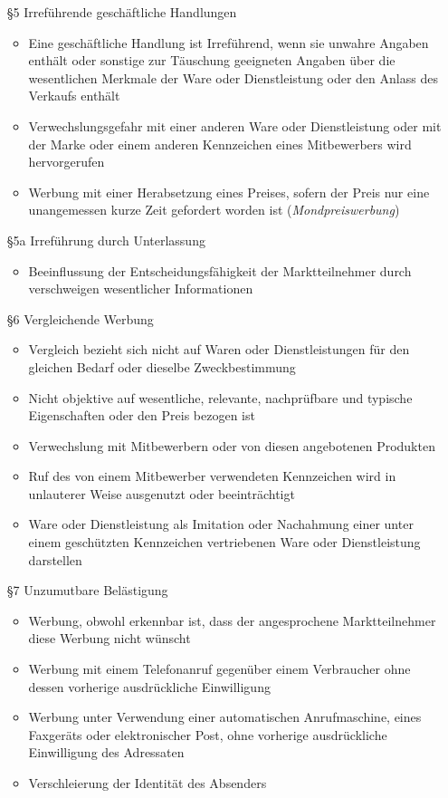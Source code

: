 \begin{itemize}
\begin{enumerate}
	\end{enumerate}
	\item[§5] Irreführende geschäftliche Handlungen
	\begin{itemize}
		\item Eine geschäftliche Handlung ist Irreführend, wenn sie unwahre Angaben enthält oder sonstige zur Täuschung geeigneten Angaben über die wesentlichen Merkmale der Ware oder Dienstleistung oder den Anlass des Verkaufs enthält
		\item Verwechslungsgefahr mit einer anderen Ware oder Dienstleistung oder mit der Marke oder einem anderen Kennzeichen eines Mitbewerbers wird hervorgerufen
		\item Werbung mit einer Herabsetzung eines Preises, sofern der Preis nur eine unangemessen kurze Zeit gefordert worden ist ({\it Mondpreiswerbung})
	\end{itemize}
	\item[§5a] Irreführung durch Unterlassung
	\begin{itemize}
		\item Beeinflussung der Entscheidungsfähigkeit der Marktteilnehmer durch verschweigen wesentlicher Informationen
	\end{itemize}
	\item[§6] Vergleichende Werbung
	\begin{itemize}
		\item Vergleich bezieht sich nicht auf Waren oder Dienstleistungen für den gleichen Bedarf oder dieselbe Zweckbestimmung
		\item Nicht objektive auf wesentliche, relevante, nachprüfbare und typische Eigenschaften oder den Preis bezogen ist
		\item Verwechslung mit Mitbewerbern oder von diesen angebotenen Produkten
		\item Ruf des von einem Mitbewerber verwendeten Kennzeichen wird in unlauterer Weise ausgenutzt oder beeinträchtigt
		\item Ware oder Dienstleistung als Imitation oder Nachahmung einer unter einem geschützten Kennzeichen vertriebenen Ware oder Dienstleistung darstellen
	\end{itemize}
	\item[§7] Unzumutbare Belästigung
	\begin{itemize}
		\item Werbung, obwohl erkennbar ist, dass der angesprochene Marktteilnehmer diese Werbung nicht wünscht
		\item Werbung mit einem Telefonanruf gegenüber einem Verbraucher ohne dessen vorherige ausdrückliche Einwilligung
		\item Werbung unter Verwendung einer automatischen Anrufmaschine, eines Faxgeräts oder elektronischer Post, ohne vorherige ausdrückliche Einwilligung des Adressaten
		\item Verschleierung der Identität des Absenders
	\end{itemize}
\end{itemize}


